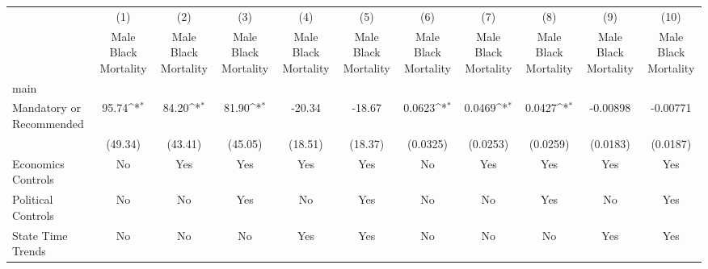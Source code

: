 {
\def\sym#1{\ifmmode^{#1}\else\(^{#1}\)\fi}
\begin{longtable}{l*{10}{c}}
\hline\hline\endfirsthead\hline\endhead\hline\endfoot\endlastfoot
                    &\multicolumn{1}{c}{(1)}&\multicolumn{1}{c}{(2)}&\multicolumn{1}{c}{(3)}&\multicolumn{1}{c}{(4)}&\multicolumn{1}{c}{(5)}&\multicolumn{1}{c}{(6)}&\multicolumn{1}{c}{(7)}&\multicolumn{1}{c}{(8)}&\multicolumn{1}{c}{(9)}&\multicolumn{1}{c}{(10)}\\
                    &\multicolumn{1}{c}{Male Black Mortality}&\multicolumn{1}{c}{Male Black Mortality}&\multicolumn{1}{c}{Male Black Mortality}&\multicolumn{1}{c}{Male Black Mortality}&\multicolumn{1}{c}{Male Black Mortality}&\multicolumn{1}{c}{Male Black Mortality}&\multicolumn{1}{c}{Male Black Mortality}&\multicolumn{1}{c}{Male Black Mortality}&\multicolumn{1}{c}{Male Black Mortality}&\multicolumn{1}{c}{Male Black Mortality}\\
\hline
main                &                     &                     &                     &                     &                     &                     &                     &                     &                     &                     \\
Mandatory or Recommended&       95.74\sym{*}  &       84.20\sym{*}  &       81.90\sym{*}  &      -20.34         &      -18.67         &      0.0623\sym{*}  &      0.0469\sym{*}  &      0.0427\sym{*}  &    -0.00898         &    -0.00771         \\
                    &     (49.34)         &     (43.41)         &     (45.05)         &     (18.51)         &     (18.37)         &    (0.0325)         &    (0.0253)         &    (0.0259)         &    (0.0183)         &    (0.0187)         \\
[1em]
Economics Controls  &          No         &         Yes         &         Yes         &         Yes         &         Yes         &          No         &         Yes         &         Yes         &         Yes         &         Yes         \\
[1em]
Political Controls  &          No         &          No         &         Yes         &          No         &         Yes         &          No         &          No         &         Yes         &          No         &         Yes         \\
[1em]
State Time Trends   &          No         &          No         &          No         &         Yes         &         Yes         &          No         &          No         &          No         &         Yes         &         Yes         \\

\end{longtable}}

